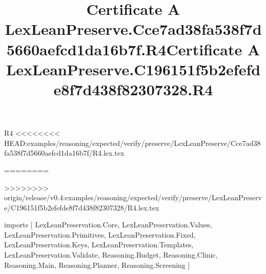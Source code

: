 \begin{lexlean}{R4}
<<<<<<<< HEAD:examples/reasoning/expected/verify/preserve/LexLeanPreserve/Cce7ad38fa538f7d5660aefcd1da16b7f/R4.lex.tex
\title{Certificate A LexLeanPreserve.Cce7ad38fa538f7d5660aefcd1da16b7f.R4}
========
\title{Certificate A LexLeanPreserve.C196151f5b2efefde8f7d438f82307328.R4}
>>>>>>>> origin/release/v0.4:examples/reasoning/expected/verify/preserve/LexLeanPreserve/C196151f5b2efefde8f7d438f82307328/R4.lex.tex
\begin{coremodule}
imports [
  LexLeanPreservation.Core,
  LexLeanPreservation.Values,
  LexLeanPreservation.Primitives,
  LexLeanPreservation.Fixed,
  LexLeanPreservation.Keys,
  LexLeanPreservation.Templates,
  LexLeanPreservation.Validate,
  Reasoning.Budget,
  Reasoning.Clinic,
  Reasoning.Main,
  Reasoning.Planner,
  Reasoning.Screening
]


\end{coremodule}
\end{lexlean}

